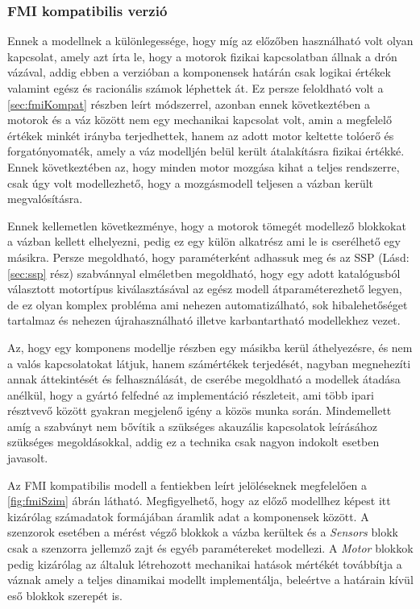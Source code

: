         \subsubsection{FMI kompatibilis verzió}
        Ennek a modellnek a különlegessége, hogy míg az előzőben használható volt olyan kapcsolat, amely azt írta le, hogy a motorok fizikai kapcsolatban állnak a drón vázával, addig ebben a verzióban a komponensek határán csak logikai értékek valamint egész és racionális számok léphettek át.
        Ez persze feloldható volt a \ref{sec:fmiKompat} részben leírt módszerrel, azonban ennek következtében a motorok és a váz között nem egy mechanikai kapcsolat volt, amin a megfelelő értékek minkét irányba terjedhettek, hanem az adott motor keltette tolóerő és forgatónyomaték, amely a váz modelljén belül került átalakításra fizikai értékké. Ennek következtében az, hogy minden motor mozgása kihat a teljes rendszerre, csak úgy volt modellezhető, hogy a mozgásmodell teljesen a vázban került megvalósításra.

        Ennek kellemetlen következménye, hogy a motorok tömegét modellező blokkokat a vázban kellett elhelyezni, pedig ez egy külön alkatrész ami le is cserélhető egy másikra.
        Persze megoldható, hogy paraméterként adhassuk meg és az SSP (Lásd: \ref{sec:ssp} rész) szabvánnyal elméletben megoldható, hogy egy adott katalógusból választott motortípus kiválasztásával az egész modell átparaméterezhető legyen, de ez olyan komplex probléma ami nehezen automatizálható, sok hibalehetőséget tartalmaz és nehezen újrahasználható illetve karbantartható modellekhez vezet.

        Az, hogy egy komponens modellje részben egy másikba kerül áthelyezésre, és nem a valós kapcsolatokat látjuk, hanem számértékek terjedését, nagyban megnehezíti annak áttekintését és felhasználását, de cserébe megoldható a modellek átadása anélkül, hogy a gyártó felfedné az implementáció részleteit, ami több ipari résztvevő között gyakran megjelenő igény a közös munka során.
        Mindemellett amíg a szabványt nem bővítik a szükséges akauzális kapcsolatok leírásához szükséges megoldásokkal, addig ez a technika csak nagyon indokolt esetben javasolt.

        Az FMI kompatibilis modell a fentiekben leírt jelöléseknek megfelelően a \ref{fig:fmiSzim} ábrán látható.
        Megfigyelhető, hogy az előző modellhez képest itt kizárólag számadatok formájában áramlik adat a komponensek között.
        A szenzorok esetében a mérést végző blokkok a vázba kerültek és a \emph{Sensors} blokk csak a szenzorra jellemző zajt és egyéb paramétereket modellezi.
        A \emph{Motor} blokkok pedig kizárólag az általuk létrehozott mechanikai hatások mértékét továbbítja a váznak amely a teljes dinamikai modellt implementálja, beleértve a határain kívül eső blokkok szerepét is.

